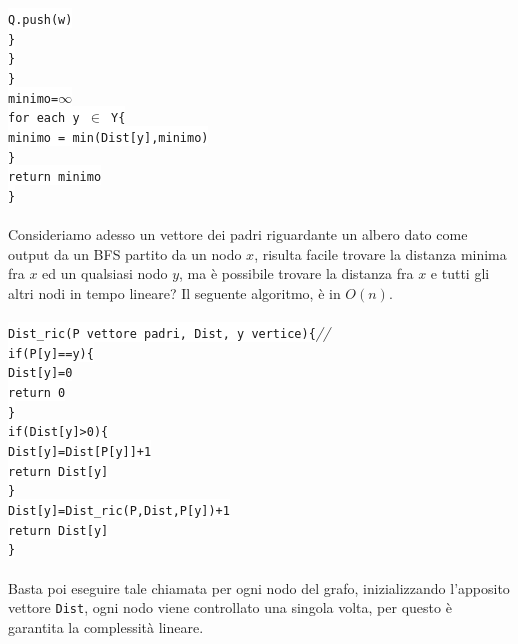 \documentclass[12pt, letterpaper]{article}
\newcommand{\code}[1]{\colorbox{light-gray}{\texttt{#1}}}
\newcommand{\codee}[1]{\colorbox{white}{\texttt{#1}}}
\newcommand{\acc}{\\\hphantom{}\\}
\newcommand{\comm}[1]{\color{lg}\textit{\hphantom{spaz}// \text{#1}}\color{black}}
\begin{document}
\hphantom{ident}\hphantom{ident}\hphantom{ident}\codee{}\hphantom{ident}\codee{Q.push(w)}\\
\hphantom{ident}\hphantom{ident}\hphantom{ident}\codee{\}}\\
\hphantom{ident}\hphantom{ident}\codee{\}}\\
\hphantom{ident}\codee{\}}\\
\hphantom{ident}\codee{minimo=$\infty$}\\
\hphantom{ident}\codee{for each y $\in$ Y\{}\\
\hphantom{ident}\hphantom{ident}\codee{minimo = min(Dist[y],minimo)}\\
\hphantom{ident}\codee{\}}\\
\hphantom{ident}\codee{return minimo}\\
\codee{\}}\acc
Consideriamo adesso un vettore dei padri riguardante un albero dato come output da un BFS partito da un nodo $x$, risulta
facile trovare la distanza minima fra $x$ ed un qualsiasi nodo $y$, ma è possibile trovare la distanza fra
$x$ e tutti gli altri nodi in tempo lineare? Il seguente algoritmo, è in $O(n)$.\acc
\codee{Dist\_ric(P vettore padri, Dist, y vertice)\{}\comm{chiamata ricorsiva}\\
\hphantom{ident}\codee{if(P[y]==y)\{}\\
\hphantom{ident}\hphantom{ident}\codee{Dist[y]=0}\\
\hphantom{ident}\hphantom{ident}\codee{return 0}\\
\hphantom{ident}\codee{\}}\\
\hphantom{ident}\codee{if(Dist[y]>0)\{}\\
\hphantom{ident}\hphantom{ident}\codee{Dist[y]=Dist[P[y]]+1}\\
\hphantom{ident}\hphantom{ident}\codee{return Dist[y]}\\
\hphantom{ident}\codee{\}}\\
\hphantom{ident}\codee{Dist[y]=Dist\_ric(P,Dist,P[y])+1}\\
\hphantom{ident}\codee{return Dist[y]}\\
\codee{\}}\acc
Basta poi eseguire tale chiamata per ogni nodo del grafo, inizializzando l'apposito vettore \code{Dist}, ogni nodo viene controllato
una singola volta, per questo è garantita la complessità lineare.
\end{document}
